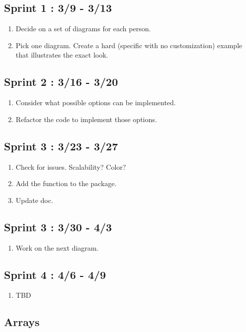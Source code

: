 \documentclass[10pt,a4paper,english]{article}
\begin{document}
\subsection{Sprint 1 : 3/9 - 3/13}
\begin{enumerate}
\item Decide on a set of diagrams for each person.
\item Pick one diagram. Create a hard (specific with no customization) example that illustrates the exact look.
\end{enumerate}
\subsection{Sprint 2 : 3/16 - 3/20}
\begin{enumerate}
\item Consider what possible options can be implemented.
\item Refactor the code to implement those options.
\end{enumerate}
\subsection{Sprint 3 : 3/23 - 3/27}
\begin{enumerate}
\item Check for issues. Scalability? Color? 
\item Add the function to the package.
\item Update doc.
\end{enumerate}
\subsection{Sprint 3 : 3/30 - 4/3}
\begin{enumerate}
\item Work on the next diagram.
\end{enumerate}
\subsection{Sprint 4 : 4/6 - 4/9}
\begin{enumerate}
\item TBD
\end{enumerate}



\newpage
\thispagestyle{fancy}

\subsection*{Arrays}
\end{document}
